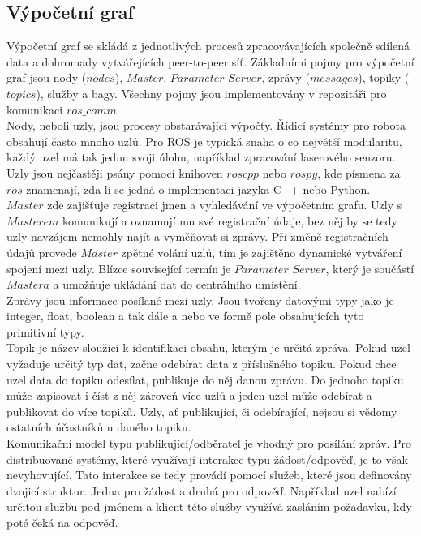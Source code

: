 \documentclass[12pt]{report}
\begin{document}
\subsection{Výpočetní graf}
Výpočetní graf se skládá z jednotlivých procesů zpracovávajících společně sdílená data a dohromady vytvářejících peer-to-peer síť. Základními pojmy pro výpočetní graf jsou nody ($nodes$), $Master$, $Parameter$ $Server$, zprávy ($messages$), topiky ($topics$), služby a bagy. Všechny pojmy jsou implementovány v repozitáři pro komunikaci $ros\_comm$.\\
\indent Nody, neboli uzly, jsou procesy obstarávající výpočty. Řídicí systémy pro robota obsahují často mnoho uzlů. Pro ROS je typická snaha o co největší modularitu, každý uzel má tak jednu svoji úlohu, například zpracování laserového senzoru. Uzly jsou nejčastěji psány pomocí knihoven $roscpp$ nebo $rospy$, kde písmena za $ros$ znamenají, zda-li se jedná o implementaci jazyka C++ nebo Python.\\
\indent $Master$ zde zajišťuje registraci jmen a vyhledávání ve výpočetním grafu. Uzly s $Masterem$ komunikují a oznamují mu své registrační údaje, bez něj by se tedy uzly navzájem nemohly najít a vyměňovat si zprávy. Při změně registračních údajů provede $Master$ zpětné volání uzlů, tím je zajištěno dynamické vytváření spojení mezi uzly. Blízce související termín je $Parameter$ $Server$, který je součástí $Mastera$ a umožňuje ukládání dat do centrálního umístění.\\
\indent Zprávy jsou informace posílané mezi uzly. Jsou tvořeny datovými typy jako je integer, float, boolean a tak dále a nebo ve formě pole obsahujících tyto primitivní typy.\\
\indent Topik je název sloužící k identifikaci obsahu, kterým je určitá zpráva. Pokud uzel vyžaduje určitý typ dat, začne odebírat data z příslušného topiku. Pokud chce uzel data do topiku odesílat, publikuje do něj danou zprávu. Do jednoho topiku může zapisovat i číst z něj zároveň více uzlů a jeden uzel může odebírat a publikovat do více topiků. Uzly, ať publikující, či odebírající, nejsou si vědomy ostatních účastníků u daného topiku.\\
\indent Komunikační model typu publikující/odběratel je vhodný pro posílání zpráv. Pro distribuované systémy, které využívají interakce typu žádost/odpověď, je to však nevyhovující. Tato interakce se tedy provádí pomocí služeb, které jsou definovány dvojicí struktur. Jedna pro žádost a druhá pro odpověď. Například uzel nabízí určitou službu pod jménem a klient této služby využívá zasláním požadavku, kdy poté čeká na odpověď.\\
\end{document}
